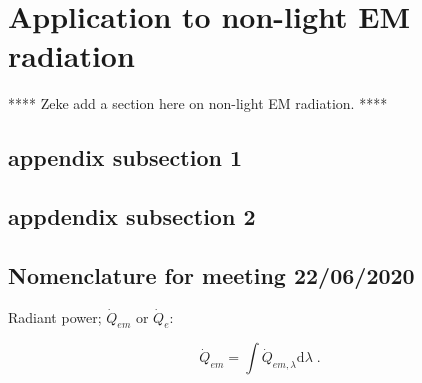 
\section{Application to non-light EM radiation}
\label{sec:non_light}
  
**** Zeke add a section here on non-light EM radiation. ****





\subsection{appendix subsection 1}
\label{sec:appendix_subsection_1}
  


\subsection{appdendix subsection 2}
\label{sec:appendix_subsection_2}
  
\subsection{Nomenclature for meeting 22/06/2020}
  
Radiant power; $\dot{Q}_{em}$ or $\dot{Q}_e$:

\begin{equation}
  \dot{Q}_{em} = \int \dot{Q}_{em, \lambda} \mathrm{d}\lambda \; .
\end{equation}


